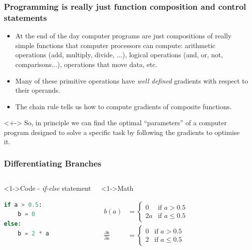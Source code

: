 \documentclass[\beamerclass]{beamer}
\begin{document}
\begin{frame}
\frametitle{Programming is really just function composition and control statements}

\begin{itemize}
	\item<+-> At the end of the day computer programs are just compositions of really simple functions that computer processors can compute: arithmetic operations (add, multiply, divide, ...), logical operations (and, or, not, comparisons...), operations that move data, etc.
	\item<+-> Many of these primitive operations have \emph{well defined} gradients with respect to their operands.
	\item<+-> The chain rule tells us how to compute gradients of composite functions.
\end{itemize}

\begin{block}<+->{}
So, in principle we can find the optimal ``parameters'' of a computer program designed to solve a specific task by following the gradients to optimise it.
\end{block}

    
\end{frame}

\begin{frame}[fragile]
\frametitle{Differentiating Branches}

\begin{columns}
    \begin{block}<1->{Code - \emph{if-else} statement}
    \begin{minipage}[c][2.5cm][c]{\linewidth}\begin{lstlisting}[language=python]
if a > 0.5:
    b = 0
else:
    b = 2 * a
\end{lstlisting}
	\end{minipage}
    \end{block}

	\begin{block}<1->{Math}
	\begin{minipage}[c][2.5cm][c]{\linewidth}\vspace{-0.5cm}%
	\begin{align*}
	b(a) &= \begin{cases} 0 & \text{if } a > 0.5 \\ 2 a & \text{if } a \leq 0.5 \end{cases} \\ 
	\frac{\partial b}{\partial a} &= \begin{cases} 0 & \text{if } a > 0.5 \\ 2 & \text{if } a \leq 0.5 \end{cases} 
	\end{align*}
   \end{minipage}
	\end{block}
\end{columns}
\end{frame}
\end{document}
